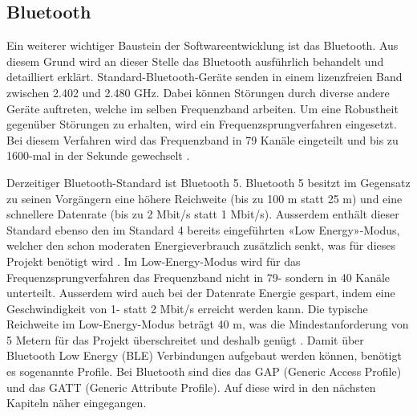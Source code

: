 \subsection{Bluetooth}\label{sec:bluetooth}
Ein weiterer wichtiger Baustein der Softwareentwicklung ist das Bluetooth. Aus diesem Grund wird an dieser Stelle das Bluetooth ausführlich behandelt und detailliert erklärt. Standard-Bluetooth-Geräte senden in einem lizenzfreien Band zwischen 2.402 und 2.480 GHz. Dabei können Störungen durch diverse andere Geräte auftreten, welche im selben Frequenzband arbeiten. Um eine Robustheit gegenüber Störungen zu erhalten, wird ein Frequenzsprungverfahren eingesetzt. Bei diesem Verfahren wird das Frequenzband in 79 Kanäle eingeteilt und bis zu 1600-mal in der Sekunde gewechselt \cite{5_Teildokument_BT}.

Derzeitiger Bluetooth-Standard ist Bluetooth 5. Bluetooth 5 besitzt im Gegensatz zu seinen Vorgängern eine höhere Reichweite (bis zu 100 m statt 25 m) und eine schnellere Datenrate (bis zu 2 Mbit/s statt 1 Mbit/s). Ausserdem enthält dieser Standard ebenso den im Standard 4 bereits eingeführten «Low Energy»-Modus, welcher den schon moderaten Energieverbrauch zusätzlich senkt, was für dieses Projekt benötigt wird \cite{5_Teildokument_BT}. Im Low-Energy-Modus wird für das Frequenzsprungverfahren das Frequenzband nicht in 79- sondern in 40 Kanäle unterteilt. Ausserdem wird auch bei der Datenrate Energie gespart, indem eine Geschwindigkeit von 1- statt 2 Mbit/s erreicht werden kann. Die typische Reichweite im Low-Energy-Modus beträgt 40 m, was die Mindestanforderung von 5 Metern für das Projekt überschreitet und deshalb genügt \cite{6_Teildokument_BT}. Damit über Bluetooth Low Energy (BLE) Verbindungen aufgebaut werden können, benötigt es sogenannte Profile. Bei Bluetooth sind dies das GAP (Generic Access Profile) und das GATT (Generic Attribute Profile). Auf diese wird in den nächsten Kapiteln näher eingegangen.

